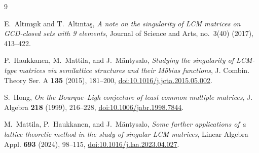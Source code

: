 \documentclass[11pt]{amsart}
\begin{document}
\begin{thebibliography}{9}

E.~Alt\i n\i\c{s}\i k and T.~Alt\i nta\c{s},
\emph{A note on the singularity of LCM matrices on GCD-closed sets
with 9 elements},
Journal of Science and Arts, no.~3(40) (2017), 413--422.

P.~Haukkanen, M.~Mattila, and J.~M\"antysalo,
\emph{Studying the singularity of LCM-type matrices via semilattice
structures and their M\"obius functions},
J. Combin. Theory Ser. A \textbf{135} (2015), 181--200,
\href{https://doi.org/10.1016/j.jcta.2015.05.002}
{doi:10.1016/j.jcta.2015.05.002}.

S.~Hong,
\emph{On the Bourque--Ligh conjecture of least common multiple
matrices},
J. Algebra \textbf{218} (1999), 216--228,
\href{https://doi.org/10.1006/jabr.1998.7844}
{doi:10.1006/jabr.1998.7844}.

M.~Mattila, P.~Haukkanen, and J.~M\"antysalo,
\emph{Some further applications of a lattice theoretic method in the
study of singular LCM matrices},
Linear Algebra Appl. \textbf{693} (2024), 98--115,
\href{https://doi.org/10.1016/j.laa.2023.04.027}
{doi:10.1016/j.laa.2023.04.027}.

\end{thebibliography}
\end{document}
